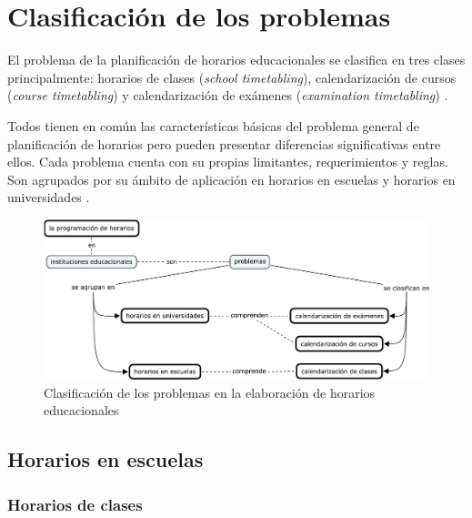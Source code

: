 \documentclass[draft,12pt,headsepline,footsepline,paper=letter]{scrreprt}
\begin{document}
\section{Clasificación de los problemas}

El problema de la planificación de horarios educacionales se clasifica en tres clases principalmente:
horarios de clases (\textit{school timetabling}),
calendarización de cursos (\textit{course timetabling}) y
calendarización de exámenes (\textit{examination timetabling}) \citep[p.~88]{schaerf99a-survey-of-automated}.

Todos tienen en común las características básicas del problema general de planificación de horarios pero pueden presentar diferencias significativas entre ellos. Cada problema cuenta con su propias limitantes, requerimientos y reglas. Son agrupados por su ámbito de aplicación en horarios en escuelas y horarios en universidades \citep[p.~10]{abdullah06heuristic-approaches}.

\begin{figure}[hbtp]
\centering
\includegraphics[width=.8\textwidth, trim=0 140 0 140]{timetabling_classification.pdf}
\caption[Clasificación del problema]{Clasificación de los problemas en la elaboración de horarios educacionales}
\label{fig:timetabling_classification}
\end{figure}

\subsection{Horarios en escuelas}


\subsubsection{Horarios de clases}
\end{document}
